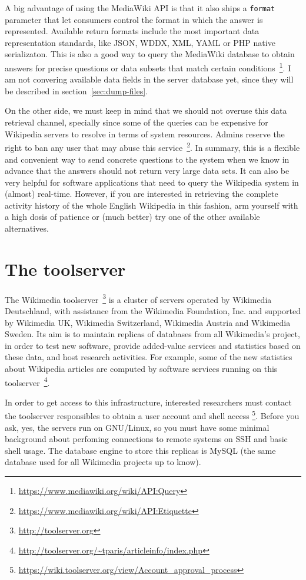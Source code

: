 A big advantage of using the MediaWiki API is that it also ships a \texttt{format}
parameter that let consumers control the format in which the answer is represented.
Available return formats include the most important data representation standards, like
JSON, WDDX, XML, YAML or PHP native serializaton. This is also a good
way to query the MediaWiki database to obtain answers for precise questions or
data subsets that match certain conditions~\footnote{\url{https://www.mediawiki.org/wiki/API:Query}}.
I am not convering available data fields in the server database yet, since
they will be described in section~\ref{sec:dump-files}.

On the other side, we must keep in mind that we should not overuse this
data retrieval channel, specially since some of the queries can be expensive for
Wikipedia servers to resolve in terms of system resources. Admins reserve the right
to ban any user that may abuse this service~\footnote{\url{https://www.mediawiki.org/wiki/API:Etiquette}}.
In summary, this is a flexible and convenient way to send concrete questions to
the system when we know in advance that the answers should not return very large
data sets. It can also be very helpful for software applications that need to query
the Wikipedia system in (almost) real-time. However,
if you are interested in retrieving the complete activity history of the
whole English Wikipedia in this fashion, arm yourself with a high dosis of 
patience or (much better) try one of the other available alternatives.

\section{The toolserver}
The Wikimedia toolserver~\footnote{\url{http://toolserver.org}} is a cluster of
servers operated by Wikimedia Deutschland, with assistance from the Wikimedia 
Foundation, Inc. and supported by Wikimedia UK, Wikimedia Switzerland, 
Wikimedia Austria and Wikimedia Sweden. Its aim is to maintain replicas of databases from
all Wikimedia's project, in order to test new software, provide added-value services
and statistics based on these data, and host research activities. For example,
some of the new statistics about Wikipedia articles are computed by software
services running on this toolserver~\footnote{\url{http://toolserver.org/~tparis/articleinfo/index.php}}.

In order to get access to this infrastructure, interested researchers must contact
the toolserver responsibles to obtain a user account and shell access
\footnote{\url{https://wiki.toolserver.org/view/Account_approval_process}}. 
Before you ask, yes, the servers run on GNU/Linux, so you must have some minimal background about
perfoming connections to remote systems on SSH and basic shell usage. The database
engine to store this replicas is MySQL (the same database used for all Wikimedia 
projects up to know).

